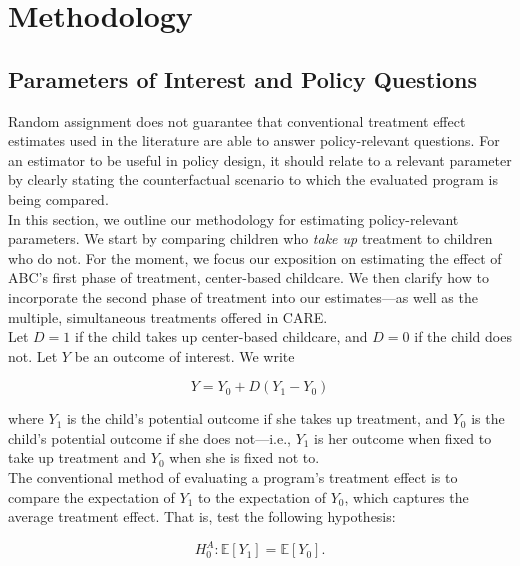 \section{Methodology} \label{section:methodology}

\subsection{Parameters of Interest and Policy Questions} \label{section:methodsquestions}

\noindent Random assignment does not guarantee that conventional treatment effect estimates used in the literature are able to answer policy-relevant questions. For an estimator to be useful in policy design, it should relate to a relevant parameter by clearly stating the counterfactual scenario to which the evaluated program is being compared.\\

\noindent In this section, we outline our methodology for estimating policy-relevant parameters. We start by comparing children who \textit{take up} treatment to children who do not. For the moment, we focus our exposition on estimating the effect of ABC's first phase of treatment, center-based childcare. We then clarify how to incorporate the second phase of treatment into our estimates---as well as the multiple, simultaneous treatments offered in CARE.\\

\noindent Let $D = 1$ if the child takes up center-based childcare, and $D=0$ if the child does not. Let $Y$ be an outcome of interest. We write

\begin{equation}
Y = Y_{0} + D \left( Y_{1} - Y_{0} \right) \label{eq:outcome}
\end{equation}

\noindent where $Y_{1}$ is the child's potential outcome if she takes up treatment, and $Y_{0}$ is the child's potential outcome if she does not---i.e., $Y_{1}$ is her outcome when fixed to take up treatment and $Y_{0}$ when she is fixed not to.\\

\noindent The conventional method of evaluating a program's treatment effect is to compare the expectation of $Y_{1}$ to the expectation of $Y_{0}$, which captures the average treatment effect. That is, test the following hypothesis:

\begin{equation}
H_{0}^A: \mathbb{E} \left[ Y_{1} \right]  = \mathbb{E} \left[ Y_{0} \right]. \label{eq:ho}
\end{equation}

